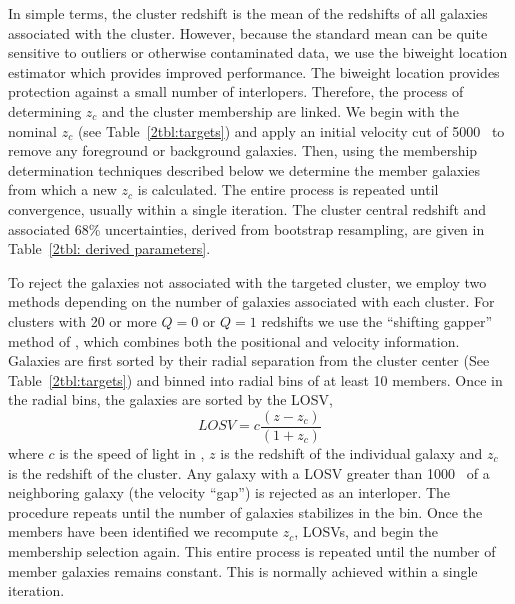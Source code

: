 In simple terms, the cluster redshift is the mean of the redshifts of all galaxies associated with the cluster. However, because the standard mean can be quite sensitive to outliers or otherwise contaminated data, we use the biweight location estimator \citep{Beers1990} which provides improved performance. The biweight location provides protection against a small number of interlopers. Therefore, the process of determining $z_c$ and the cluster membership are linked. We begin with the nominal $z_c$ (see Table~\ref{2tbl:targets}) and apply an initial velocity cut of 5000 \kms\ to remove any foreground or background galaxies. Then, using the membership determination techniques described below we determine the member galaxies from which a new $z_c$ is calculated. The entire process is repeated until convergence, usually within a single iteration. The cluster central redshift and associated 68\% uncertainties, derived from bootstrap resampling, are given in Table~\ref{2tbl: derived parameters}.

To reject the galaxies not associated with the targeted cluster, we employ two methods depending on the number of galaxies associated with each cluster. For clusters with 20 or more $Q=0$ or $Q=1$ redshifts we use the ``shifting gapper'' method of , which combines both the positional and velocity information. Galaxies are first sorted by their radial separation from the cluster center (See Table~\ref{2tbl:targets}) and binned into radial bins of at least 10 members. Once in the radial bins, the galaxies are sorted by the LOSV, 
\begin{equation}
	LOSV = c\frac{(z-z_{c})}{(1+z_{c})} 
\end{equation}
where $c$ is the speed of light in \kms, $z$ is the redshift of the individual galaxy and $z_{c}$ is the redshift of the cluster. Any galaxy with a LOSV greater than 1000 \kms\ of a neighboring galaxy (the velocity ``gap'') is rejected as an interloper. The procedure repeats until the number of galaxies stabilizes in the bin. Once the members have been identified we recompute $z_c$, LOSVs, and begin the membership selection again. This entire process is repeated until the number of member galaxies remains constant. This is normally achieved within a single iteration. 

